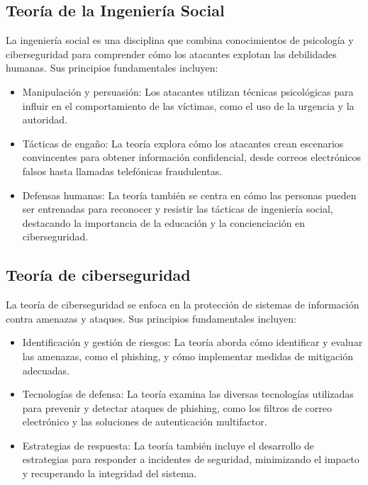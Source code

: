 \subsection{Teoría de la Ingeniería Social}
La ingeniería social es una disciplina que combina conocimientos de psicología y ciberseguridad para comprender cómo los atacantes explotan las debilidades humanas. Sus principios fundamentales incluyen:
\begin{itemize}
    \item Manipulación y persuasión: Los atacantes utilizan técnicas psicológicas para influir en el comportamiento de las víctimas, como el uso de la urgencia y la autoridad.
    \item Tácticas de engaño: La teoría explora cómo los atacantes crean escenarios convincentes para obtener información confidencial, desde correos electrónicos falsos hasta llamadas telefónicas fraudulentas.
    \item Defensas humanas: La teoría también se centra en cómo las personas pueden ser entrenadas para reconocer y resistir las tácticas de ingeniería social, destacando la importancia de la educación y la concienciación en ciberseguridad.
\end{itemize}

\subsection{Teoría de ciberseguridad}
La teoría de ciberseguridad se enfoca en la protección de sistemas de información contra amenazas y ataques. Sus principios fundamentales incluyen:
\begin{itemize}
    \item Identificación y gestión de riesgos: La teoría aborda cómo identificar y evaluar las amenazas, como el phishing, y cómo implementar medidas de mitigación adecuadas.
    \item Tecnologías de defensa: La teoría examina las diversas tecnologías utilizadas para prevenir y detectar ataques de phishing, como los filtros de correo electrónico y las soluciones de autenticación multifactor.
    \item Estrategias de respuesta: La teoría también incluye el desarrollo de estrategias para responder a incidentes de seguridad, minimizando el impacto y recuperando la integridad del sistema.
\end{itemize}
